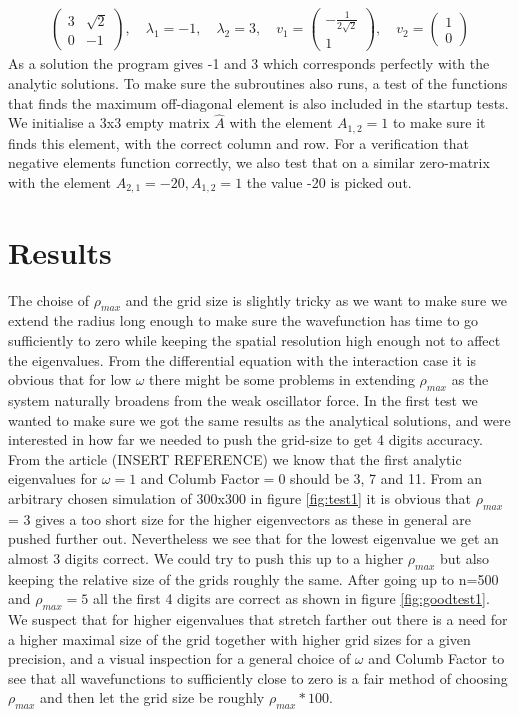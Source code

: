 \documentclass[a4paper,11pt]{article}
\begin{document}
{\begin{align}
\begin{pmatrix}
3 & \sqrt{2} \\
0 & -1 
\end{pmatrix}
, \quad \lambda_1 = -1, \quad \lambda_2 = 3, \quad v_1 = \begin{pmatrix}
-\frac{1}{2\sqrt{2}} \\
1
\end{pmatrix}, \quad v_2 = \begin{pmatrix}
1 \\
0
\end{pmatrix}
\end{align}
As a solution the program gives -1 and 3 which corresponds perfectly with the analytic solutions. To make sure the subroutines also runs, a test of the functions that finds the maximum off-diagonal element is also included in the startup tests. We initialise a 3x3 empty matrix $\hat{A}$ with the element $A_{1,2}=1$ to make sure it finds this element, with the correct column and row. For a verification that negative elements function correctly, we also test that on a similar zero-matrix with the element $A_{2,1}=-20, A_{1,2}=1$ the value -20 is picked out. 






\section*{Results}
The choise of $\rho_{max}$ and the grid size is slightly tricky as we want to make sure we extend the radius long enough to make sure the wavefunction has time to go sufficiently to zero while keeping the spatial resolution high enough not to affect the eigenvalues. From the differential equation with the interaction case it is obvious that for low $\omega$ there might be some problems in extending $\rho_{max}$ as the system naturally broadens from the weak oscillator force. In the first test we wanted to make sure we got the same results as the analytical solutions, and were interested in how far we needed to push the grid-size to get 4 digits accuracy. From the article (INSERT REFERENCE) we know that the first analytic eigenvalues for $\omega = 1$ and Columb Factor$=0$ should be 3, 7 and 11.  From an arbitrary chosen simulation of 300x300 in figure \ref{fig:test1} it is obvious that $\rho_{max}$ = 3 gives a too short size for the higher eigenvectors as these in general are pushed further out. Nevertheless we see that for the lowest eigenvalue we get an almost 3 digits correct. We could try to push this up to a higher $\rho_{max}$ but also keeping the relative size of the grids roughly the same.  After going up to n=500 and $\rho_{max}=5$ all the first 4 digits are correct as shown in figure \ref{fig:goodtest1}. We suspect that for higher eigenvalues that stretch farther out there is a need for a higher maximal size of the grid together with higher grid sizes for a given precision, and a visual inspection for a general choice of $\omega$ and Columb Factor to see that all wavefunctions to sufficiently close to zero is a fair method of choosing $\rho_{max}$ and then let the grid size be roughly $\rho_{max}*100$. 

}
\end{document}
